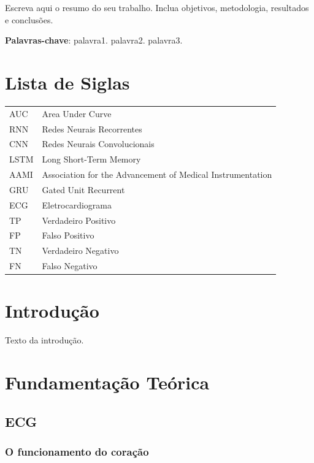 \documentclass[
    12pt,                %
    openright,           %
    oneside,             %
    a4paper,             %
    brazil               %
]{abntex2}
\begin{document}
\imprimircapa
\imprimirfolhaderosto*

\begin{resumo}
Escreva aqui o resumo do seu trabalho.  
Inclua objetivos, metodologia, resultados e conclusões.

\vspace{\onelineskip}
\noindent
\textbf{Palavras-chave}: palavra1. palavra2. palavra3.
\end{resumo}

\tableofcontents

\chapter*{Lista de Siglas} 
\begin{tabular}{ll}
AUC & Area Under Curve \\
RNN & Redes Neurais Recorrentes \\
CNN & Redes Neurais Convolucionais \\
LSTM & Long Short-Term Memory \\
AAMI & Association for the Advancement of Medical Instrumentation   \\
GRU & Gated Unit Recurrent \\
ECG & Eletrocardiograma \\
TP & Verdadeiro Positivo \\
FP & Falso Positivo \\
TN & Verdadeiro Negativo \\
FN & Falso Negativo \\
\end{tabular}


\chapter{Introdução}
Texto da introdução.

\chapter{Fundamentação Teórica}

\section{ECG}

\subsection{O funcionamento do coração}
\end{document}
